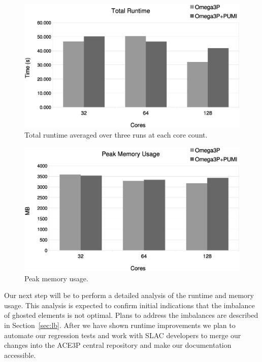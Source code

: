 \documentclass[a4paper]{article}
\begin{document}
\begin{figure}[ht]
\centering
  \includegraphics[width=\textwidth]{total-runtime.eps}
  \caption{\label{fig:time} Total runtime averaged over three runs at each core
  count.}
\end{figure}

\begin{figure}[ht]
\centering
  \includegraphics[width=\textwidth]{peak-memory-usage.eps}
  \caption{\label{fig:memusage} Peak memory usage.}
\end{figure}

Our next step will be to perform a detailed analysis of the runtime and memory
usage.
This analysis is expected to confirm initial indications that the imbalance of
ghosted elements is not optimal.
Plans to address the imbalances are described in Section~\ref{sec:lb}.
After we have shown runtime improvements we plan to automate our regression
tests and work with SLAC developers to merge our changes into
the ACE3P central repository and make our documentation accessible.

\newpage 

\end{document}
